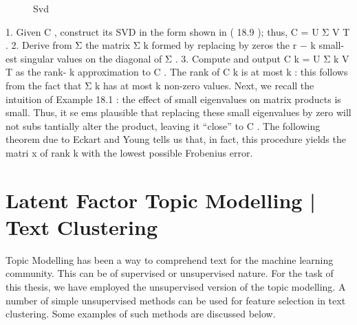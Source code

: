 \begin{figure}[H]
    {\par}
    \caption{Svd}
\end{figure}


1. Given C , construct its SVD in the form shown in ( 18.9 ); thus, C = U Σ V T . 2. Derive from Σ the matrix Σ k formed by replacing by zeros the r − k small- est singular values on the diagonal of Σ . 3. Compute and output C k = U Σ k V T as the rank- k approximation to C . The rank of C k is at most k :  this follows from the fact that Σ k has at most k non-zero values.  Next, we recall the intuition of Example 18.1 :  the effect of small eigenvalues on matrix products is small.  Thus, it se ems plausible that replacing these small eigenvalues by zero will not subs tantially alter the product, leaving it “close” to C .  The following theorem due to Eckart and Young tells us that, in fact, this procedure yields the matri x of rank k with the lowest possible Frobenius error.

\section{Latent Factor Topic Modelling | Text Clustering}

Topic Modelling has been a way to comprehend text for the machine learning community. This can be of supervised or unsupervised nature. For the task of this thesis, we have employed the unsupervised version of the topic modelling. A number of simple unsupervised methods can be used for feature selection in text clustering. Some examples of such methods are discussed below.

